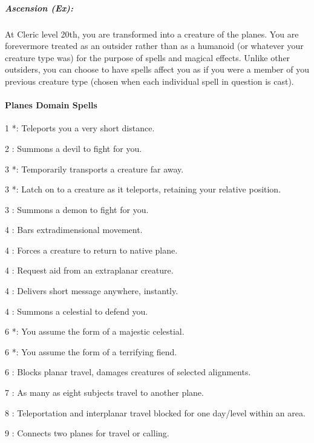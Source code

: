 % 
\subparagraph{Ascension (Ex):}
At Cleric level 20th, you are transformed into a creature of the planes.
You are forevermore treated as an outsider rather than as a humanoid (or whatever your creature type was) for the purpose of spells and magical effects.
Unlike other outsiders, you can choose to have spells affect you as if you were a member of you previous creature type (chosen when each individual spell in question is cast).
\paragraph{Planes Domain Spells}
\begin{list}{}{\leftmargin=1em}
\item[1] *: Teleports you a very short distance.
\item[2] : Summons a devil to fight for you.
\item[3] *: Temporarily transports a creature far away.
\item[3] *: Latch on to a creature as it teleports, retaining your relative position.
\item[3] : Summons a demon to fight for you.
\item[4] : Bars extradimensional movement.
\item[4] : Forces a creature to return to native plane.
\item[4] : Request aid from an extraplanar creature.
\item[4] : Delivers short message anywhere, instantly.
\item[4] : Summons a celestial to defend you.
\item[6] *: You assume the form of a majestic celestial.
\item[6] *: You assume the form of a terrifying fiend.
\item[6] : Blocks planar travel, damages creatures of selected alignments.
\item[7] : As many as eight subjects travel to another plane.
\item[8] : Teleportation and interplanar travel blocked for one day/level within an area.
\item[9] : Connects two planes for travel or calling.
\end{list}
